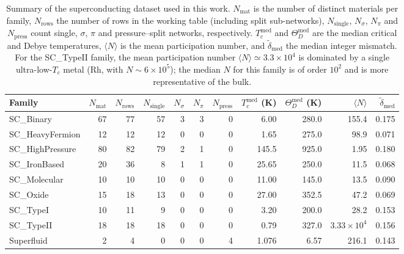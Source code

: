 \documentclass[aps,prb,twocolumn,superscriptaddress,floatfix,nofootinbib]{revtex4-2}
\begin{document}
\begin{table}[t]
  \caption{Summary of the superconducting dataset used in this work.
  $N_{\mathrm{mat}}$ is the number of distinct materials per family,
  $N_{\mathrm{rows}}$ the number of rows in the working table
  (including split sub-networks),
  $N_{\mathrm{single}}$, $N_{\sigma}$, $N_{\pi}$ and
  $N_{\mathrm{press}}$ count single, $\sigma$, $\pi$ and
  pressure--split networks, respectively.
  $T_c^{\mathrm{med}}$ and $\Theta_D^{\mathrm{med}}$ are the median
  critical and Debye temperatures, $\langle N\rangle$ is the mean
  participation number, and $\tilde\delta_{\mathrm{med}}$ the median
  integer mismatch.
  For the SC\_TypeII family, the mean participation number
  $\langle N\rangle \simeq 3.3\times 10^{4}$ is dominated by a single
  ultra-low-$T_c$ metal (Rh, with $N \sim 6\times 10^{5}$); the median
  $N$ for this family is of order $10^{2}$ and is more representative
  of the bulk.}
  \label{tab:dataset_summary}
  \begin{ruledtabular}
  \begin{tabular}{lrrrrrrrrrr}
    Family &
    $N_{\mathrm{mat}}$ &
    $N_{\mathrm{rows}}$ &
    $N_{\mathrm{single}}$ &
    $N_{\sigma}$ &
    $N_{\pi}$ &
    $N_{\mathrm{press}}$ &
    $T_c^{\mathrm{med}}$ (K) &
    $\Theta_D^{\mathrm{med}}$ (K) &
    $\langle N\rangle$ &
    $\tilde\delta_{\mathrm{med}}$ \\
    \hline
    SC\_Binary       & 67 & 77 & 57 & 3 & 3 & 0 &  6.00  & 280.0 & 155.4         & 0.175 \\
    SC\_HeavyFermion & 12 & 12 & 12 & 0 & 0 & 0 &  1.65  & 275.0 &  98.9         & 0.071 \\
    SC\_HighPressure & 80 & 82 & 79 & 2 & 1 & 0 & 145.5  & 925.0 &   1.95        & 0.180 \\
    SC\_IronBased    & 20 & 36 &  8 & 1 & 1 & 0 & 25.65  & 250.0 &  11.5         & 0.068 \\
    SC\_Molecular    & 10 & 10 & 10 & 0 & 0 & 0 & 11.00  & 145.0 &  13.5         & 0.090 \\
    SC\_Oxide        & 15 & 18 & 13 & 0 & 0 & 0 & 27.00  & 352.5 &  47.2         & 0.069 \\
    SC\_TypeI        & 10 & 11 &  9 & 0 & 0 & 0 &  3.20  & 200.0 &  28.2         & 0.153 \\
    SC\_TypeII       & 18 & 18 & 18 & 0 & 0 & 0 &  0.79  & 327.0 & $3.33\times10^{4}$ & 0.156 \\
    Superfluid       &  2 &  4 &  0 & 0 & 0 & 4 &  1.076 &  6.57 & 216.1         & 0.143 \\
  \end{tabular}
  \end{ruledtabular}
\end{table}
\end{document}
